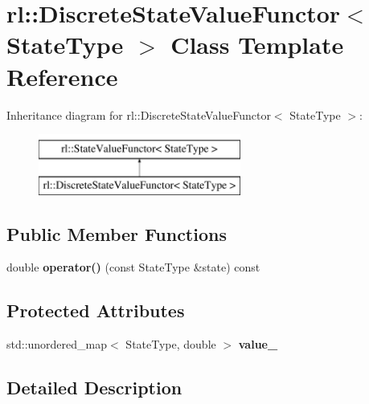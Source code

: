 \hypertarget{classrl_1_1_discrete_state_value_functor}{}\section{rl\+:\+:Discrete\+State\+Value\+Functor$<$ State\+Type $>$ Class Template Reference}
\label{classrl_1_1_discrete_state_value_functor}
Inheritance diagram for rl\+:\+:Discrete\+State\+Value\+Functor$<$ State\+Type $>$\+:\begin{figure}[H]
\begin{center}
\leavevmode
\includegraphics[height=2.000000cm]{classrl_1_1_discrete_state_value_functor}
\end{center}
\end{figure}
\subsection*{Public Member Functions}
\begin{DoxyCompactItemize}
\item 
\hypertarget{classrl_1_1_discrete_state_value_functor_a63bf8449ed047b82326242424b8f1ef1}{}\label{classrl_1_1_discrete_state_value_functor_a63bf8449ed047b82326242424b8f1ef1} 
double {\bfseries operator()} (const State\+Type \&state) const
\end{DoxyCompactItemize}
\subsection*{Protected Attributes}
\begin{DoxyCompactItemize}
\item 
\hypertarget{classrl_1_1_discrete_state_value_functor_addd64220de60e628cfdbf9bb6b5798ad}{}\label{classrl_1_1_discrete_state_value_functor_addd64220de60e628cfdbf9bb6b5798ad} 
std\+::unordered\+\_\+map$<$ State\+Type, double $>$ {\bfseries value\+\_\+}
\end{DoxyCompactItemize}


\subsection{Detailed Description}
